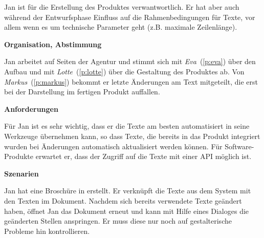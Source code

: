 \begin{multicols}{2}

\begin{center}
\end{center}


Jan ist für die Erstellung des Produktes verwantwortlich. Er hat aber auch während der Entwurfsphase Einfluss auf die Rahmenbedingungen für Texte, vor allem wenn es um technische Parameter geht (z.B. maximale Zeilenlänge).

\textbf{Organisation, Abstimmung}

Jan arbeitet auf Seiten der Agentur und stimmt sich mit \emph{Eva}~(\ref{p:eva}) über den Aufbau und mit \emph{Lotte}~(\ref{p:lotte}) über die Gestaltung des Produktes ab. Von \emph{Markus}~(\ref{p:markus}) bekommt er letzte Änderungen am Text mitgeteilt, die erst bei der Darstellung im fertigen Produkt auffallen.

\textbf{Anforderungen}

Für Jan ist es sehr wichtig, dass er die Texte am besten automatisiert in seine Werkzeuge übernehmen kann, so dass Texte, die bereits in das Produkt integriert wurden bei Änderungen automatisch aktualisiert werden können. Für Software-Produkte erwartet er, dass der Zugriff auf die Texte mit einer API möglich ist.

\columnbreak

\textbf{Szenarien}

Jan hat eine Broschüre in  erstellt. Er verknüpft die Texte aus dem System mit den Texten im Dokument. Nachdem sich bereits verwendete Texte geändert haben, öffnet Jan das Dokument erneut und kann mit Hilfe eines Dialoges die geänderten Stellen anspringen. Er muss diese nur noch auf gestalterische Probleme hin kontrollieren.


\end{multicols}
